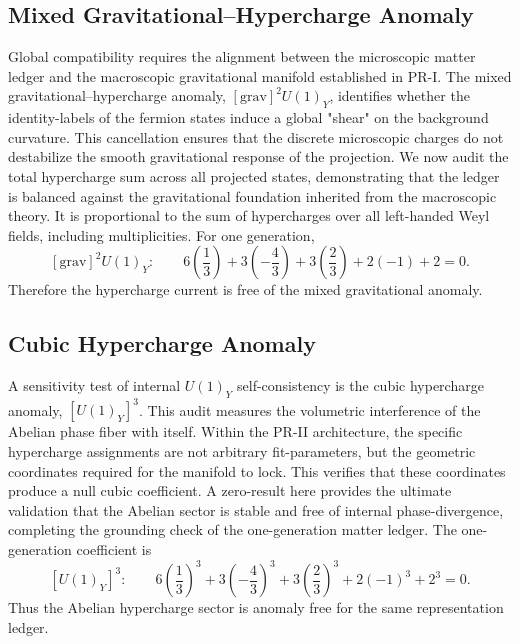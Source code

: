 \documentclass[11pt]{article}
\begin{document}
\subsection{Mixed Gravitational--Hypercharge Anomaly}
\label{sec:pr2_mixed_gravitational_hypercharge_anomaly}
Global compatibility requires the alignment between the microscopic matter ledger and the macroscopic gravitational manifold established in PR-I. The mixed gravitational–hypercharge anomaly, $[\mathrm{grav}]^2U(1)_Y$, identifies whether the identity-labels of the fermion states induce a global "shear" on the background curvature. This cancellation ensures that the discrete microscopic charges do not destabilize the smooth gravitational response of the projection. We now audit the total hypercharge sum across all projected states, demonstrating that the ledger is balanced against the gravitational foundation inherited from the macroscopic theory. It is proportional to the sum of hypercharges over all left-handed Weyl fields, including multiplicities. 
For one generation,
\begin{equation}
\boxed{
[\mathrm{grav}]^2U(1)_Y:
\qquad
6\left(\frac13\right)
+
3\left(-\frac43\right)
+
3\left(\frac23\right)
+
2(-1)
+
2
=
0.
}
\end{equation}
Therefore the hypercharge current is free of the mixed gravitational anomaly.

\subsection{Cubic Hypercharge Anomaly}
\label{sec:pr2_cubic_hypercharge_anomaly}
A sensitivity test of internal $U(1)_Y$ self-consistency is the cubic hypercharge anomaly, $[U(1)_Y]^3$. This audit measures the volumetric interference of the Abelian phase fiber with itself. Within the PR-II architecture, the specific hypercharge assignments are not arbitrary fit-parameters, but the  geometric coordinates required for the manifold to lock. This verifies that these coordinates produce a null cubic coefficient. A zero-result here provides the ultimate validation that the Abelian sector is stable and free of internal phase-divergence, completing the grounding check of the one-generation matter ledger. The one-generation coefficient is
\begin{equation}
\boxed{
[U(1)_Y]^3:
\qquad
6\left(\frac13\right)^3
+
3\left(-\frac43\right)^3
+
3\left(\frac23\right)^3
+
2(-1)^3
+
2^3
=
0.
}
\end{equation}
Thus the Abelian hypercharge sector is anomaly free for the same representation ledger.
\end{document}
